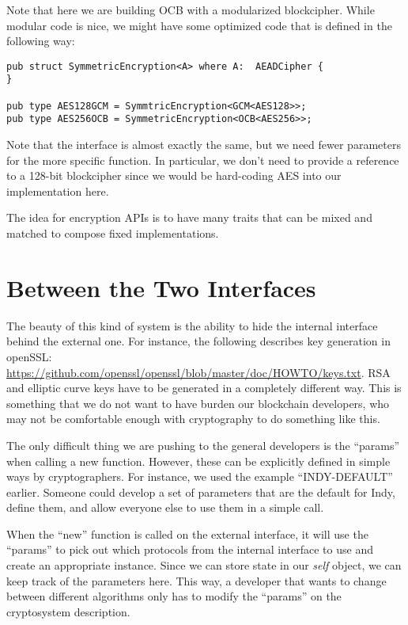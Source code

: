 Note that here we are building OCB with a modularized blockcipher.  While modular code is nice, we might have some optimized code that is defined in the following way:

\begin{verbatim}
pub struct SymmetricEncryption<A> where A:  AEADCipher {
}

pub type AES128GCM = SymmtricEncryption<GCM<AES128>>;
pub type AES256OCB = SymmetricEncryption<OCB<AES256>>;
\end{verbatim}

Note that the interface is almost exactly the same, but we need fewer parameters for the more specific function.  In particular, we don't need to provide a reference to a 128-bit blockcipher since we would be hard-coding AES into our implementation here.

The idea for encryption APIs is to have many traits that can be mixed and matched to compose fixed implementations.

\section{Between the Two Interfaces}
The beauty of this kind of system is the ability to hide the internal interface behind the external one.  For instance, the following describes key generation in openSSL:  \url{https://github.com/openssl/openssl/blob/master/doc/HOWTO/keys.txt}.  RSA and elliptic curve keys have to be generated in a completely different way.  This is something that we do not want to have burden our blockchain developers, who may not be comfortable enough with cryptography to do something like this.

The only difficult thing we are pushing to the general developers is the ``params'' when calling a new function.  However, these can be explicitly defined in simple ways by cryptographers.  For instance, we used the example ``INDY-DEFAULT'' earlier.  Someone could develop a set of parameters that are the default for Indy, define them, and allow everyone else to use them in a simple call.

When the ``new'' function is called on the external interface, it will use the ``params'' to pick out which protocols from the internal interface to use and create an appropriate instance.  Since we can store state in our \emph{self} object, we can keep track of the parameters here.  This way, a developer that wants to change between different algorithms only has to modify the ``params'' on the cryptosystem description. 


 
